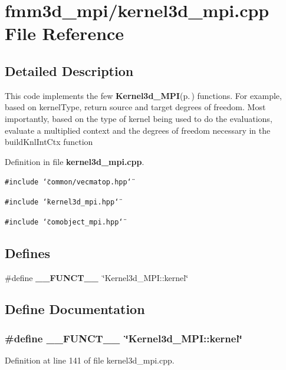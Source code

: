 \section{fmm3d\_\-mpi/kernel3d\_\-mpi.cpp File Reference}
\label{kernel3d__mpi_8cpp}


\subsection{Detailed Description}
This code implements the few {\bf Kernel3d\_\-MPI}{\rm (p.\,\pageref{classKernel3d__MPI})} functions. For example, based on kernel\-Type, return source and target degrees of freedom. Most importantly, based on the type of kernel being used to do the evaluations, evaluate a multiplied context and the degrees of freedom necessary in the build\-Knl\-Int\-Ctx function 

Definition in file {\bf kernel3d\_\-mpi.cpp}.

{\tt \#include \char`\"{}common/vecmatop.hpp\char`\"{}}\par
{\tt \#include \char`\"{}kernel3d\_\-mpi.hpp\char`\"{}}\par
{\tt \#include \char`\"{}comobject\_\-mpi.hpp\char`\"{}}\par
\subsection*{Defines}
\begin{CompactItemize}
\item 
\#define {\bf \_\-\_\-FUNCT\_\-\_\-}~\char`\"{}Kernel3d\_\-MPI::kernel\char`\"{}
\end{CompactItemize}


\subsection{Define Documentation}
\subsubsection{\setlength{\rightskip}{0pt plus 5cm}\#define \_\-\_\-FUNCT\_\-\_\-~\char`\"{}Kernel3d\_\-MPI::kernel\char`\"{}}\label{kernel3d__mpi_8cpp_2818853adf63a17949cf67d73c1d4473_2818853adf63a17949cf67d73c1d4473}




Definition at line 141 of file kernel3d\_\-mpi.cpp.
